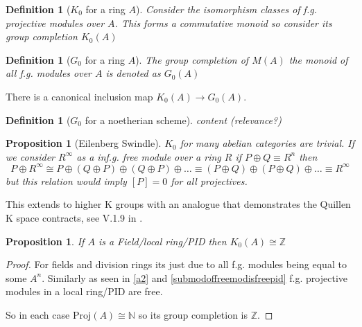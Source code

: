 \documentclass[12pt]{article}
\numberwithin{equation}{section}
\newcommand{\Z}{\mathbb{Z}}
\newcommand{\N}{\mathbb{N}}
\newcounter{dummy} \numberwithin{dummy}{section}
\newtheorem{definition}[dummy]{Definition}
\newtheorem{proposition}[dummy]{Proposition}
\begin{document}
	
	\begin{definition}[$K_0$ for a ring $A$]
		Consider the isomorphism classes of f.g. projective modules over $A$. This forms a commutative monoid so consider its group completion $K_0(A)$
	\end{definition}
	\begin{definition}[$G_0$ for a ring $A$]
	The group completion of $M(A) $ the monoid of all f.g. modules over $A$ is denoted as $G_0(A)$
	\end{definition}
	There is a canonical inclusion map $K_0(A) \to G_0(A)$.
	
	\begin{definition}[$G_0$ for a noetherian scheme]
		content (relevance?)
	\end{definition}
	
	\begin{proposition}[Eilenberg Swindle]
		$K_0$ for many abelian categories are trivial. If we consider $R^\infty$ as a inf.g. free module over a ring $R$ if $P \oplus Q \equiv R^n$ then \[ P \oplus R^\infty \cong P \oplus (Q \oplus P) \oplus (Q \oplus P) \oplus \dots \equiv (P \oplus Q) \oplus (P \oplus Q) \oplus \dots \equiv R^\infty \] but this relation would imply $[P]=0 $ for all projectives. 
	\end{proposition}
	This extends to higher K groups with an analogue that demonstrates the Quillen K space contracts, see V.1.9 in \cite{weibel2013k}.
	
%	
	\begin{proposition}\label{k0pidisZ}
	If $A$ is a Field/local ring/PID then $K_0(A)\cong\Z$
	\end{proposition}
	\begin{proof}
		For fields and division rings its just due to all f.g. modules being equal to some $A^n$. Similarly as seen in \ref{a2} and \ref{submodoffreemodisfreepid} f.g. projective modules in a local ring/PID are free.
		
		So in each case $\mathrm{Proj}(A) \cong \N$ so its group completion is $\Z.$
		\end{proof}
		
\end{document}

